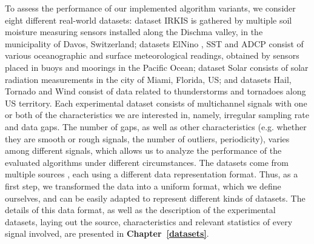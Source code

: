 To assess the performance of our implemented algorithm variants, we consider eight different real-world datasets: dataset IRKIS \cite{dataset:irkis} is gathered by multiple soil moisture measuring sensors installed along the Dischma valley, in the municipality of Davos, Switzerland; datasets ElNino \cite{dataset:elnino}, SST and ADCP \cite{dataset:sst1} consist of various oceanographic and surface meteorological readings, obtained by sensors placed in buoys and moorings in the Pacific Ocean; dataset Solar \cite{dataset:solar} consists of solar radiation measurements in the city of Miami, Florida, US; and datasets Hail, Tornado and Wind \cite{dataset:spc} consist of data related to thunderstorms and tornadoes along US territory. Each experimental dataset consists of multichannel signals with one or both of the characteristics we are interested in, namely, irregular sampling rate and data gaps. The number of gaps, as well as other characteristics (e.g. whether they are smooth or rough signals, the number of outliers, periodicity), varies among different signals, which allows us to analyze the performance of the evaluated algorithms under different circumstances. The datasets come from multiple sources \dataCite, each using a different data representation format. Thus, as a first step, we transformed the data into a uniform format, which we define ourselves, and can be easily adapted to represent different kinds of datasets. The details of this data format, as well as the description of the experimental datasets, laying out the source, characteristics and relevant statistics of every signal involved, are presented in \textbf{Chapter~\ref{datasets}}.


